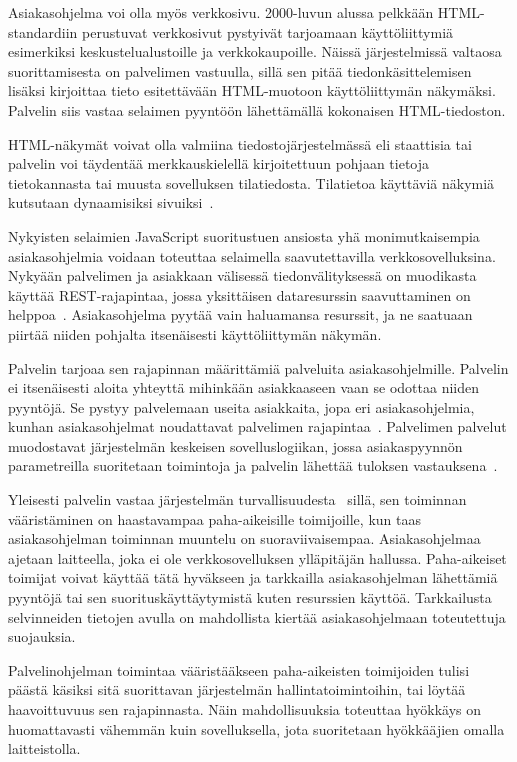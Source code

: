 \documentclass[finnish]{tktltiki2}%
\theoremstyle{definition}
\theoremstyle{remark}
\begin{document}
Asiakasohjelma voi olla myös verkkosivu. 2000-luvun alussa
pelkkään HTML-standardiin perustuvat verkkosivut pystyivät
tarjoamaan käyttöliittymiä esimerkiksi keskustelualustoille ja verkkokaupoille.
Näissä järjestelmissä valtaosa suorittamisesta on palvelimen vastuulla,
sillä sen pitää tiedonkäsittelemisen lisäksi kirjoittaa tieto
esitettävään HTML-muotoon käyttöliittymän näkymäksi. Palvelin
siis vastaa selaimen pyyntöön lähettämällä kokonaisen HTML-tiedoston.

HTML-näkymät voivat olla valmiina tiedostojärjestelmässä eli staattisia tai
palvelin voi täydentää merkkauskielellä kirjoitettuun pohjaan
tietoja tietokannasta tai muusta sovelluksen tilatiedosta. 
Tilatietoa käyttäviä näkymiä kutsutaan dynaamisiksi sivuiksi~\cite{pai_flash_1999}.

Nykyisten selaimien JavaScript suoritustuen ansiosta yhä
monimutkaisempia asiakasohjelmia voidaan toteuttaa
selaimella saavutettavilla verkkosovelluksina.
Nykyään palvelimen ja asiakkaan
välisessä tiedonvälityksessä on muodikasta käyttää REST-rajapintaa, jossa
yksittäisen dataresurssin saavuttaminen on helppoa~\cite{battle_bridging_2008}.
Asiakasohjelma pyytää vain haluamansa resurssit, ja ne saatuaan piirtää
niiden pohjalta
itsenäisesti käyttöliittymän näkymän.

Palvelin tarjoaa sen rajapinnan määrittämiä palveluita asiakasohjelmille.
Palvelin ei itsenäisesti aloita yhteyttä mihinkään
asiakkaaseen vaan se odottaa niiden pyyntöjä.
Se pystyy palvelemaan useita asiakkaita, jopa
eri asiakasohjelmia, kunhan asiakasohjelmat noudattavat
palvelimen rajapintaa~\cite{sinha_client-server_1992}.
Palvelimen palvelut muodostavat järjestelmän keskeisen
sovelluslogiikan, jossa asiakaspyynnön parametreilla
suoritetaan toimintoja ja palvelin lähettää
tuloksen vastauksena~\cite{sinha_client-server_1992}.

Yleisesti palvelin vastaa järjestelmän turvallisuudesta~\cite{sinha_client-server_1992} sillä,
sen toiminnan vääristäminen on haastavampaa paha-aikeisille
toimijoille, kun taas asiakasohjelman toiminnan muuntelu on suoraviivaisempaa.
Asiakasohjelmaa ajetaan laitteella, joka ei ole verkkosovelluksen
ylläpitäjän hallussa. Paha-aikeiset toimijat voivat käyttää tätä hyväkseen
ja tarkkailla asiakasohjelman lähettämiä pyyntöjä tai sen
suorituskäyttäytymistä kuten resurssien käyttöä.
Tarkkailusta selvinneiden tietojen avulla on mahdollista
kiertää asiakasohjelmaan toteutettuja suojauksia.

Palvelinohjelman toimintaa vääristääkseen
paha-aikeisten toimijoiden tulisi päästä
käsiksi sitä suorittavan järjestelmän hallintatoimintoihin, tai
löytää haavoittuvuus sen rajapinnasta. Näin mahdollisuuksia
toteuttaa hyökkäys on huomattavasti vähemmän kuin sovelluksella, jota
suoritetaan hyökkääjien omalla laitteistolla.
\end{document}
